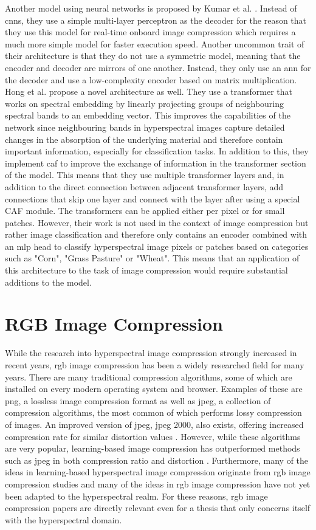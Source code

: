 Another model using neural networks is proposed by Kumar et al. \citep{leal-taixe_onboard_2019}. Instead of \acp{cnn}, they use a simple multi-layer perceptron as the decoder for the reason that they use this model for real-time onboard image compression which requires a much more simple model for faster execution speed. Another uncommon trait of their architecture is that they do not use a symmetric model, meaning that the encoder and decoder are mirrors of one another. Instead, they only use an \ac{ann} for the decoder and use a low-complexity encoder based on matrix multiplication.
Hong et al. \citep{hong_spectralformer_2022} propose a novel architecture as well. They use a transformer that works on spectral embedding by linearly projecting groups of neighbouring spectral bands to an embedding vector. This improves the capabilities of the network since neighbouring bands in hyperspectral images capture detailed changes in the absorption of the underlying material and therefore contain important information, especially for classification tasks.
In addition to this, they implement \ac{caf} to improve the exchange of information in the transformer section of the model. This means that they use multiple transformer layers and, in addition to the direct connection between adjacent transformer layers, add connections that skip one layer and connect with the layer after using a special CAF module.
The transformers can be applied either per pixel or for small patches. However, their work is not used in the context of image compression but rather image classification and therefore only contains an encoder combined with an \ac{mlp} head to classify hyperspectral image pixels or patches based on categories such as "Corn", "Grass Pasture" or "Wheat". This means that an application of this architecture to the task of image compression would require substantial additions to the model. 
\section{RGB Image Compression \label{sec:ch2rgb}}
While the research into hyperspectral image compression strongly increased in recent years, \ac{rgb} image compression has been a widely researched field for many years. There are many traditional compression algorithms, some of which are installed on every modern operating system and browser. Examples of these are \ac{png}, a lossless image compression format as well as \ac{jpeg}, a collection of compression algorithms, the most common of which performs lossy compression of images. An improved version of \ac{jpeg}, \ac{jpeg} 2000, also exists, offering increased compression rate for similar distortion values \citep{fowler_three-dimensional_2007}.
However, while these algorithms are very popular, learning-based image compression has outperformed methods such as \ac{jpeg} in both compression ratio and distortion \citep{balle_end--end_2017,balle_variational_2018}. Furthermore, many of the ideas in learning-based hyperspectral image compression originate from \ac{rgb} image compression studies and many of the ideas in \ac{rgb} image compression have not yet been adapted to the hyperspectral realm. For these reasons, \ac{rgb} image compression papers are directly relevant even for a thesis that only concerns itself with the hyperspectral domain.

